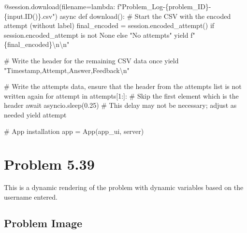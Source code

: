 \documentclass[
  letterpaper,
  DIV=11,
  numbers=noendperiod]{scrreprt}
\newenvironment{Shaded}{\begin{snugshade}}{\end{snugshade}}
\newcommand{\NormalTok}[1]{\textcolor[rgb]{0.00,0.23,0.31}{#1}}
\begin{document}
\begin{Shaded}
\begin{Highlighting}[]
\NormalTok{    @session.download(filename=lambda: f"Problem\_Log{-}\{problem\_ID\}{-}\{input.ID()\}.csv")}
\NormalTok{    async def download():}
\NormalTok{        \# Start the CSV with the encoded attempt (without label)}
\NormalTok{        final\_encoded = session.encoded\_attempt() if session.encoded\_attempt is not None else "No attempts"}
\NormalTok{        yield f"\{final\_encoded\}\textbackslash{}n\textbackslash{}n"}
        
\NormalTok{        \# Write the header for the remaining CSV data once}
\NormalTok{        yield "Timestamp,Attempt,Answer,Feedback\textbackslash{}n"}
        
\NormalTok{        \# Write the attempts data, ensure that the header from the attempts list is not written again}
\NormalTok{        for attempt in attempts[1:]:  \# Skip the first element which is the header}
\NormalTok{            await asyncio.sleep(0.25)  \# This delay may not be necessary; adjust as needed}
\NormalTok{            yield attempt}


\NormalTok{\# App installation}
\NormalTok{app = App(app\_ui, server)}
\end{Highlighting}
\end{Shaded}

\chapter*{Problem 5.39}\label{problem-5.39}


This is a dynamic rendering of the problem with dynamic variables based
on the username entered.

\section*{Problem Image}\label{problem-image-38}

\end{document}
